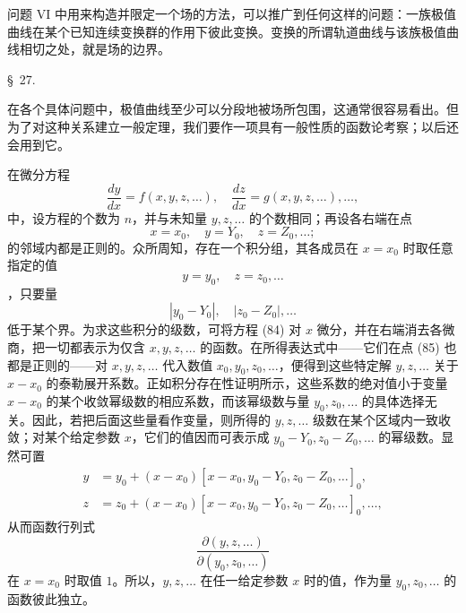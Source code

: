 \documentclass[11pt,a4paper,leqno]{article}
\begin{document}
问题 VI 中用来构造并限定一个场的方法，可以推广到任何这样的问题：一族极值曲线在某个已知连续变换群的作用下彼此变换。变换的所谓轨道曲线与该族极值曲线相切之处，就是场的边界。


\begin{center}{\large \S~27.}\end{center}

在各个具体问题中，极值曲线至少可以分段地被场所包围，这通常很容易看出。但为了对这种关系建立一般定理，我们要作一项具有一般性质的函数论考察；以后还会用到它。

在微分方程
\begin{equation}\tag{84}
\frac{dy}{dx}=f(x,y,z,\ldots),\quad
\frac{dz}{dx}=g(x,y,z,\ldots),\ldots,
\end{equation}
中，设方程的个数为 $n$，并与未知量 $y,z,\ldots$ 的个数相同；再设各右端在点
\begin{equation}\tag{85}
x=x_0,\quad y=Y_0,\quad z=Z_0,\ldots;
\end{equation}
的邻域内都是正则的。众所周知，存在一个积分组，其各成员在 $x=x_0$ 时取任意指定的值
\[
y=y_0,\quad z=z_0,\ldots
\]
，只要量
\[
|y_0-Y_0|,\quad |z_0-Z_0|,\ldots
\]
低于某个界。为求这些积分的级数，可将方程 (84) 对 $x$ 微分，并在右端消去各微商，把一切都表示为仅含 $x,y,z,\ldots$ 的函数。在所得表达式中——它们在点 (85) 也都是正则的——对 $x,y,z,\ldots$ 代入数值 $x_0,y_0,z_0,\ldots$，便得到这些特定解 $y,z,\ldots$ 关于 $x-x_0$ 的泰勒展开系数。正如积分存在性证明所示，这些系数的绝对值小于变量 $x-x_0$ 的某个收敛幂级数的相应系数，而该幂级数与量 $y_0,z_0,\ldots$ 的具体选择无关。因此，若把后面这些量看作变量，则所得的 $y,z,\ldots$ 级数在某个区域内一致收敛；对某个给定参数 $x$，它们的值因而可表示成 $y_0-Y_0,z_0-Z_0,\ldots$ 的幂级数。显然可置
\[
\begin{aligned}
y&=y_0+(x-x_0)[x-x_0,y_0-Y_0,z_0-Z_0,\ldots]_0,\\
z&=z_0+(x-x_0)[x-x_0,y_0-Y_0,z_0-Z_0,\ldots]_0,\ldots,
\end{aligned}
\]
从而函数行列式
\[
\frac{\partial(y,z,\ldots)}{\partial(y_0,z_0,\ldots)}
\]
在 $x=x_0$ 时取值 $1$。所以，$y,z,\ldots$ 在任一给定参数 $x$ 时的值，作为量 $y_0,z_0,\ldots$ 的函数彼此独立。
\end{document}
